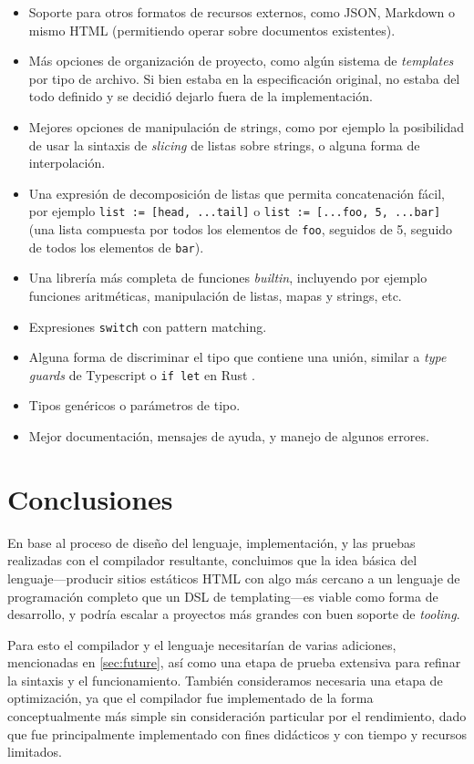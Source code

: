 \begin{itemize}
	\item Soporte para otros formatos de recursos externos, como JSON, Markdown o mismo HTML (permitiendo operar sobre documentos existentes).
	\item Más opciones de organización de proyecto, como algún sistema de \textit{templates} por tipo de archivo. Si bien estaba en la especificación original, no estaba del todo definido y se decidió dejarlo fuera de la implementación.
	\item Mejores opciones de manipulación de strings, como por ejemplo la posibilidad de usar la sintaxis de \textit{slicing} de listas sobre strings, o alguna forma de interpolación.
	\item Una expresión de decomposición de listas que permita concatenación fácil, por ejemplo \texttt{list := [head, ...tail]} o \texttt{list := [...foo, 5, ...bar]} (una lista compuesta por todos los elementos de \texttt{foo}, seguidos de 5, seguido de todos los elementos de \texttt{bar}).
	\item Una librería más completa de funciones \textit{builtin}, incluyendo por ejemplo funciones aritméticas, manipulación de listas, mapas y strings, etc.
	\item Expresiones \texttt{switch} con pattern matching.
	\item Alguna forma de discriminar el tipo que contiene una unión, similar a \textit{type guards} de Typescript \cite{ts:type_guards} o \texttt{if let} en Rust \cite{rs:if_let}.
	\item Tipos genéricos o parámetros de tipo.
	\item Mejor documentación, mensajes de ayuda, y manejo de algunos errores.
\end{itemize}

\section{Conclusiones}

En base al proceso de diseño del lenguaje, implementación, y las pruebas realizadas con el compilador resultante, concluimos que la idea básica del lenguaje—producir sitios estáticos HTML con algo más cercano a un lenguaje de programación completo que un DSL de templating—es viable como forma de desarrollo, y podría escalar a proyectos más grandes con buen soporte de \textit{tooling}.

Para esto el compilador y el lenguaje necesitarían de varias adiciones, mencionadas en \autoref{sec:future}, así como una etapa de prueba extensiva para refinar la sintaxis y el funcionamiento. También consideramos necesaria una etapa de optimización, ya que el compilador fue implementado de la forma conceptualmente más simple sin consideración particular por el rendimiento, dado que fue principalmente implementado con fines didácticos y con tiempo y recursos limitados.

